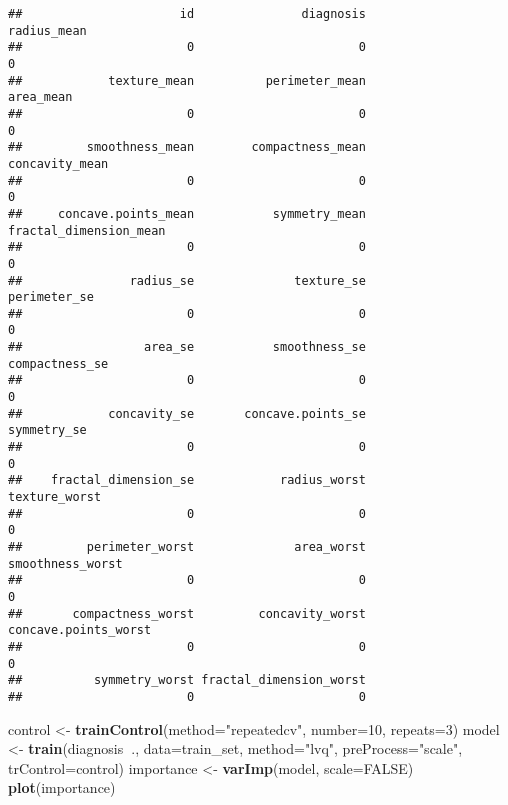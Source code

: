\documentclass[]{article}
\newenvironment{Shaded}{\begin{snugshade}}{\end{snugshade}}
\newcommand{\DataTypeTok}[1]{\textcolor[rgb]{0.13,0.29,0.53}{#1}}
\newcommand{\DecValTok}[1]{\textcolor[rgb]{0.00,0.00,0.81}{#1}}
\newcommand{\KeywordTok}[1]{\textcolor[rgb]{0.13,0.29,0.53}{\textbf{#1}}}
\newcommand{\NormalTok}[1]{#1}
\newcommand{\OperatorTok}[1]{\textcolor[rgb]{0.81,0.36,0.00}{\textbf{#1}}}
\newcommand{\OtherTok}[1]{\textcolor[rgb]{0.56,0.35,0.01}{#1}}
\newcommand{\StringTok}[1]{\textcolor[rgb]{0.31,0.60,0.02}{#1}}
\begin{document}
\begin{verbatim}
##                      id               diagnosis             radius_mean 
##                       0                       0                       0 
##            texture_mean          perimeter_mean               area_mean 
##                       0                       0                       0 
##         smoothness_mean        compactness_mean          concavity_mean 
##                       0                       0                       0 
##     concave.points_mean           symmetry_mean  fractal_dimension_mean 
##                       0                       0                       0 
##               radius_se              texture_se            perimeter_se 
##                       0                       0                       0 
##                 area_se           smoothness_se          compactness_se 
##                       0                       0                       0 
##            concavity_se       concave.points_se             symmetry_se 
##                       0                       0                       0 
##    fractal_dimension_se            radius_worst           texture_worst 
##                       0                       0                       0 
##         perimeter_worst              area_worst        smoothness_worst 
##                       0                       0                       0 
##       compactness_worst         concavity_worst    concave.points_worst 
##                       0                       0                       0 
##          symmetry_worst fractal_dimension_worst 
##                       0                       0
\end{verbatim}

\begin{Shaded}
\end{Shaded}

\begin{Shaded}
\begin{Highlighting}[]
\NormalTok{control <-}\StringTok{ }\KeywordTok{trainControl}\NormalTok{(}\DataTypeTok{method=}\StringTok{"repeatedcv"}\NormalTok{, }\DataTypeTok{number=}\DecValTok{10}\NormalTok{, }\DataTypeTok{repeats=}\DecValTok{3}\NormalTok{)}
\NormalTok{model <-}\StringTok{ }\KeywordTok{train}\NormalTok{(diagnosis}\OperatorTok{~}\NormalTok{., }\DataTypeTok{data=}\NormalTok{train_set, }\DataTypeTok{method=}\StringTok{"lvq"}\NormalTok{, }\DataTypeTok{preProcess=}\StringTok{"scale"}\NormalTok{, }\DataTypeTok{trControl=}\NormalTok{control)}
\NormalTok{importance <-}\StringTok{ }\KeywordTok{varImp}\NormalTok{(model, }\DataTypeTok{scale=}\OtherTok{FALSE}\NormalTok{)}
\KeywordTok{plot}\NormalTok{(importance)}
\end{Highlighting}
\end{Shaded}
\end{document}
